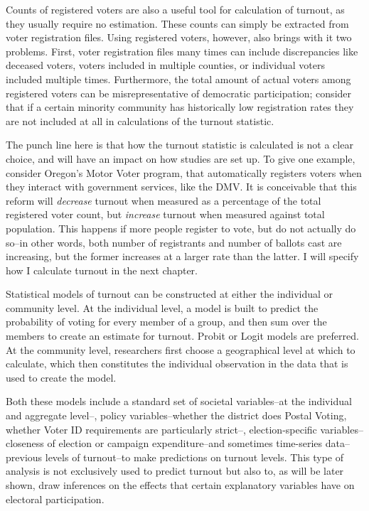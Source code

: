 \documentclass[12pt,twoside]{reedthesis}
\begin{document}
  Counts of registered voters are also a useful tool for calculation of
  turnout, as they usually require no estimation. These counts can simply
  be extracted from voter registration files. Using registered voters,
  however, also brings with it two problems. First, voter registration
  files many times can include discrepancies like deceased voters, voters
  included in multiple counties, or individual voters included multiple
  times. Furthermore, the total amount of actual voters among registered
  voters can be misrepresentative of democratic participation; consider
  that if a certain minority community has historically low registration
  rates they are not included at all in calculations of the turnout
  statistic.
  
  The punch line here is that how the turnout statistic is calculated is
  not a clear choice, and will have an impact on how studies are set up.
  To give one example, consider Oregon's Motor Voter program, that
  automatically registers voters when they interact with government
  services, like the DMV. It is conceivable that this reform will
  \emph{decrease} turnout when measured as a percentage of the total
  registered voter count, but \emph{increase} turnout when measured
  against total population. This happens if more people register to vote,
  but do not actually do so--in other words, both number of registrants
  and number of ballots cast are increasing, but the former increases at a
  larger rate than the latter. I will specify how I calculate turnout in
  the next chapter.
  
  Statistical models of turnout can be constructed at either the
  individual or community level. At the individual level, a model is built
  to predict the probability of voting for every member of a group, and
  then sum over the members to create an estimate for turnout. Probit or
  Logit models are preferred. At the community level, researchers first
  choose a geographical level at which to calculate, which then
  constitutes the individual observation in the data that is used to
  create the model.
  
  Both these models include a standard set of societal variables--at the
  individual and aggregate level--, policy variables--whether the district
  does Postal Voting, whether Voter ID requirements are particularly
  strict--, election-specific variables--closeness of election or campaign
  expenditure--and sometimes time-series data--previous levels of
  turnout--to make predictions on turnout levels. This type of analysis is
  not exclusively used to predict turnout but also to, as will be later
  shown, draw inferences on the effects that certain explanatory variables
  have on electoral participation.
  
\end{document}
